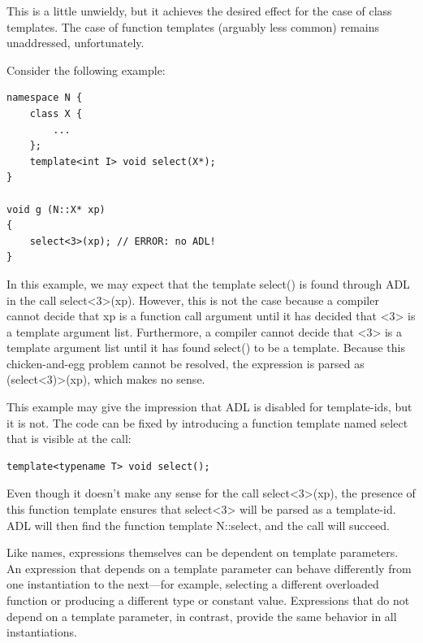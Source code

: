 This is a little unwieldy, but it achieves the desired effect for the case of class templates. The case of function templates (arguably less common) remains unaddressed, unfortunately.


Consider the following example:

\begin{lstlisting}[style=styleCXX]
namespace N {
	class X {
		...
	};
	template<int I> void select(X*);
}

void g (N::X* xp)
{
	select<3>(xp); // ERROR: no ADL!
}
\end{lstlisting}

In this example, we may expect that the template select() is found through ADL in the call select<3>(xp). However, this is not the case because a compiler cannot decide that xp is a function call argument until it has decided that <3> is a template argument list. Furthermore, a compiler cannot decide that <3> is a template argument list until it has found select() to be a template. Because this chicken-and-egg problem cannot be resolved, the expression is parsed as (select<3)>(xp), which makes no sense.

This example may give the impression that ADL is disabled for template-ids, but it is not. The code can be fixed by introducing a function template named select that is visible at the call:

\begin{lstlisting}[style=styleCXX]
template<typename T> void select();
\end{lstlisting}

Even though it doesn’t make any sense for the call select<3>(xp), the presence of this function template ensures that select<3> will be parsed as a template-id. ADL will then find the function template N::select, and the call will succeed.


Like names, expressions themselves can be dependent on template parameters. An expression that depends on a template parameter can behave differently from one instantiation to the next—for example, selecting a different overloaded function or producing a different type or constant value. Expressions that do not depend on a template parameter, in contrast, provide the same behavior in all instantiations.

